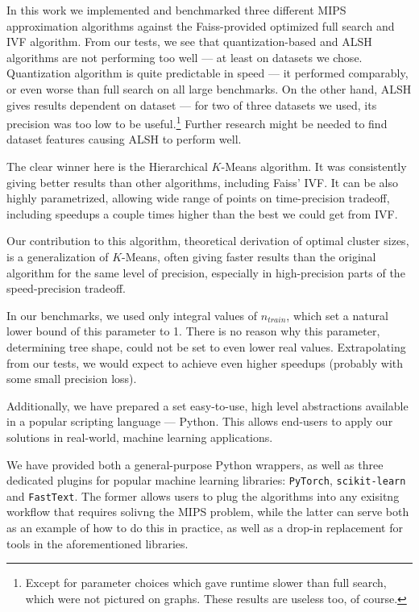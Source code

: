 In this work we implemented and benchmarked three different MIPS 
approximation algorithms
against the Faiss-provided optimized full search and IVF algorithm.
From our tests, we see that quantization-based and ALSH algorithms
are not performing too well --- at least on datasets we chose.
Quantization algorithm is quite predictable in speed --- it performed
comparably, or even worse than full search on all large benchmarks.
On the other hand, ALSH gives results dependent on dataset --- for
two of three datasets we used, its precision was too low to be useful.\footnote{
Except for parameter choices which gave runtime slower than full search,
which were not pictured on graphs. These results are useless too, of course.}
Further research might be needed to find dataset features causing
ALSH to perform well.

The clear winner here is the Hierarchical $K$-Means algorithm. It was consistently
giving better results than other algorithms, including Faiss' IVF. It can be also
highly parametrized, allowing wide range of points on time-precision tradeoff,
including speedups a couple times higher than the best we could get from IVF.

Our contribution to this algorithm, theoretical derivation of optimal cluster sizes,
is a generalization of $K$-Means, often giving faster results than the original algorithm
for the same level of precision, especially in high-precision parts of the
speed-precision tradeoff.

In our benchmarks, we used only integral values of $n_{train}$, which set
a natural lower bound of this parameter to 1. There is no reason why this
parameter, determining tree shape, could not be set to even lower real values.
Extrapolating from our tests, we would expect to achieve even higher speedups
(probably with some small precision loss).

Additionally, we have prepared a set easy-to-use, high level abstractions available in a popular
scripting language --- Python. This allows end-users to apply our solutions in real-world, machine
learning applications.

We have provided both a general-purpose Python wrappers, as well as three dedicated plugins for popular machine
learning libraries: \texttt{PyTorch}, \texttt{scikit-learn} and \texttt{FastText}. The former allows users to plug
the algorithms into any exisitng workflow that requires solivng the MIPS problem, while the latter can serve both
as an example of how to do this in practice, as well as a drop-in replacement for tools in the aforementioned libraries.


